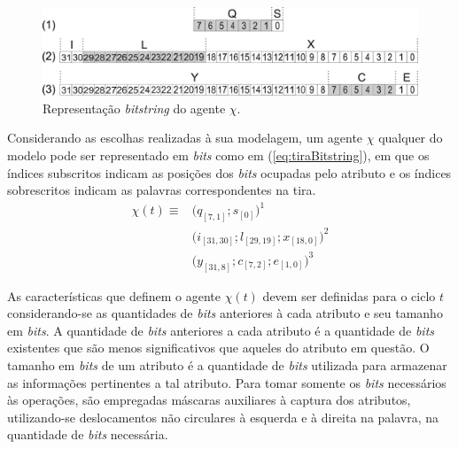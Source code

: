 \begin{figure}[H]
 \centering
 \includegraphics[width=1.0\textwidth]{Figuras/ModelagemBitstring/Tira.eps}
 \caption{Representação \textit{bitstring} do agente $\chi$.}
 \label{fig:tiraBitstring}
\end{figure} 

Considerando as escolhas realizadas à sua modelagem, um agente $\chi$ qualquer do modelo pode ser representado em \textit{bits} como em (\ref{eq:tiraBitstring}), em que os índices subscritos indicam as posições dos \textit{bits} ocupadas pelo atributo e os índices sobrescritos indicam as palavras correspondentes na tira.
\begin{equation}
\begin{split}
 \chi(t)  \equiv  & \big(q_{[7, 1]}; s_{[0]}\big)^1 \\
		  & \big(i_{[31, 30]}; l_{[29, 19]}; x_{[18, 0]}\big)^2 \\
		  & \big(y_{[31, 8]}; c_{[7, 2]}; e_{[1, 0]}\big)^3
 \label{eq:tiraBitstring}
\end{split}
\end{equation}

As características que definem o agente $\chi(t)$ devem ser definidas para o ciclo $t$ considerando-se as quantidades de \textit{bits} anteriores à cada atributo e seu tamanho em \textit{bits}. A quantidade de \textit{bits} anteriores a cada atributo é a quantidade de \textit{bits} existentes que são menos significativos que aqueles do atributo em questão. O tamanho em \textit{bits} de um atributo é a quantidade de \textit{bits} utilizada para armazenar as informações pertinentes a tal atributo. Para tomar somente os \textit{bits} necessários às operações, são empregadas máscaras auxiliares à captura dos atributos, utilizando-se deslocamentos não circulares à esquerda e à direita na palavra, na quantidade de \textit{bits} necessária.

